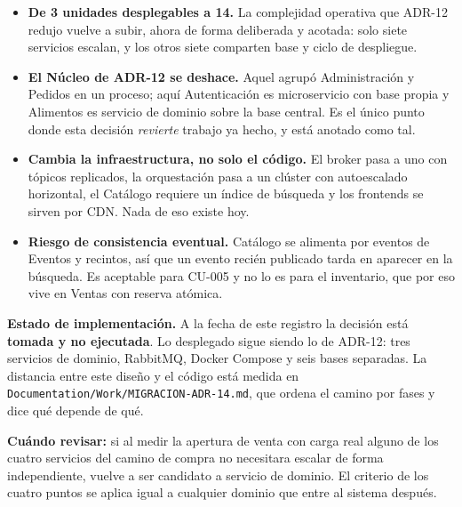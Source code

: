\begin{itemize}
  \item \textbf{De 3 unidades desplegables a 14.} La complejidad operativa que
        ADR-12 redujo vuelve a subir, ahora de forma deliberada y acotada: solo
        siete servicios escalan, y los otros siete comparten base y ciclo de
        despliegue.
  \item \textbf{El Núcleo de ADR-12 se deshace.} Aquel agrupó Administración y
        Pedidos en un proceso; aquí Autenticación es microservicio con base
        propia y Alimentos es servicio de dominio sobre la base central. Es el
        único punto donde esta decisión \textit{revierte} trabajo ya hecho, y
        está anotado como tal.
  \item \textbf{Cambia la infraestructura, no solo el código.} El broker pasa a
        uno con tópicos replicados, la orquestación pasa a un clúster con
        autoescalado horizontal, el Catálogo requiere un índice de búsqueda y
        los frontends se sirven por CDN. Nada de eso existe hoy.
  \item \textbf{Riesgo de consistencia eventual.} Catálogo se alimenta por
        eventos de Eventos y recintos, así que un evento recién publicado tarda
        en aparecer en la búsqueda. Es aceptable para CU-005 y no lo es para el
        inventario, que por eso vive en Ventas con reserva atómica.
\end{itemize}

\textbf{Estado de implementación.} A la fecha de este registro la decisión está
\textbf{tomada y no ejecutada}. Lo desplegado sigue siendo lo de ADR-12: tres
servicios de dominio, RabbitMQ, Docker Compose y seis bases separadas. La
distancia entre este diseño y el código está medida en
\texttt{Documentation/Work/MIGRACION-ADR-14.md}, que ordena el camino por fases
y dice qué depende de qué.

\textbf{Cuándo revisar:} si al medir la apertura de venta con carga real alguno
de los cuatro servicios del camino de compra no necesitara escalar de forma
independiente, vuelve a ser candidato a servicio de dominio. El criterio de los
cuatro puntos se aplica igual a cualquier dominio que entre al sistema después.
